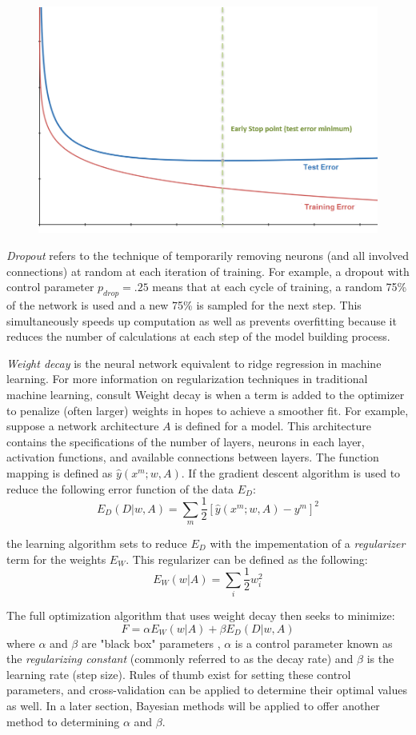  \begin{figure}[H]
    \centering
    \includegraphics[width=0.5\linewidth]{Figures/early_stop.png}
    \vspace{-20pt}
    \label{earlystop}
\end{figure}

\textit{Dropout} refers to the technique of temporarily removing neurons (and all involved connections) at random  at each iteration of training.\cite{srivastava2014dropout}  For example, a dropout with control parameter $p_{drop} = .25$ means that at each cycle of training, a random 75\% of the network is used and a new 75\% is sampled for the next step. This simultaneously speeds up computation as well as prevents overfitting because it reduces the number of calculations at each step of the model building process.

\textit{Weight decay} is the neural network equivalent to ridge regression in machine learning.  For more information on regularization techniques in traditional machine learning, consult \cite{Goodfellow-et-al-2016}  Weight decay is when a  term is added to the optimizer to penalize (often larger) weights in hopes to achieve a smoother fit. \cite{mackay1992practical}  For example, suppose a network architecture $A$ is defined for a model.  This architecture contains the specifications of the number of layers, neurons in each layer, activation functions, and available connections between layers.  The function mapping is defined as $\hat{y}(x^m;w,A)$.  If the gradient descent algorithm is used to reduce the following error function of the data $E_D$:
$$
E_D(D|w,A) = \sum_m \frac{1}{2} [\hat{y}(x^m;w,A) - y^m]^2
$$

the learning algorithm sets to reduce $E_D$ with the impementation of a \textit{regularizer} term for the weights $E_W$.  This regularizer can be defined as the following:
$$
E_W(w|A) = \sum_i \frac{1}{2} w_i^2
$$

The full optimization algorithm that uses weight decay then seeks to minimize:
$$
F = \alpha E_W(w|A) + \beta E_D(D|w,A)
$$
where $\alpha$ and $\beta$ are "black box" parameters \cite{mackay1992practical},  $\alpha$ is a control parameter known as the \textit{regularizing constant} (commonly referred to as the decay rate) and $\beta$ is the learning rate (step size).  Rules of thumb exist for setting these control parameters, and cross-validation can be applied to determine their optimal values as well.  In a later section, Bayesian methods will be applied to offer another method to determining $\alpha$ and $\beta$.

